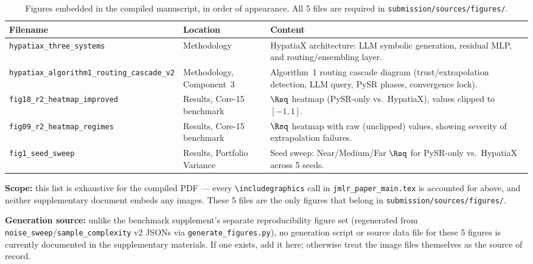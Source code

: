 
\begin{table}[H]
\centering
\caption{Figures embedded in the compiled manuscript, in order of
  appearance. All 5 files are required in \texttt{submission/sources/figures/}.}
\label{tab:figlist_complete}
\small
\renewcommand{\arraystretch}{1.25}
\begin{tabular}{L{5.2cm} L{3.0cm} L{5.3cm}}
\toprule
\textbf{Filename} & \textbf{Location} & \textbf{Content}\\
\midrule
\texttt{hypatiax\_three\_systems} &
  Methodology &
  HypatiaX architecture: LLM symbolic generation, residual MLP, and
  routing/ensembling layer.\\
\texttt{hypatiax\_algorithm1\_routing\_cascade\_v2} &
  Methodology, Component~3 &
  Algorithm~1 routing cascade diagram (trust/extrapolation detection,
  LLM query, PySR phases, convergence lock).\\
\texttt{fig18\_r2\_heatmap\_improved} &
  Results, Core-15 benchmark &
  $\Rsq$ heatmap (PySR-only vs.\ HypatiaX), values clipped to
  $[-1,1]$.\\
\texttt{fig09\_r2\_heatmap\_regimes} &
  Results, Core-15 benchmark &
  $\Rsq$ heatmap with raw (unclipped) values, showing severity of
  extrapolation failures.\\
\texttt{fig1\_seed\_sweep} &
  Results, Portfolio Variance &
  Seed sweep: Near/Medium/Far $\Rsq$ for PySR-only vs.\ HypatiaX
  across 5 seeds.\\
\bottomrule
\end{tabular}
\end{table}

\noindent\textbf{Scope:} this list is exhaustive for the compiled
PDF --- every \verb|\includegraphics| call in
\texttt{jmlr\_paper\_main.tex} is accounted for above, and neither
supplementary document embeds any images. These 5 files are the only
figures that belong in \texttt{submission/sources/figures/}.

\noindent\textbf{Generation source:} unlike the benchmark
supplement's separate reproducibility figure set (regenerated from
\texttt{noise\_sweep}/\texttt{sample\_complexity} v2 JSONs via
\texttt{generate\_figures.py}), no generation script or source data
file for these 5 figures is currently documented in the
supplementary materials. If one exists, add it here; otherwise treat
the image files themselves as the source of record.
